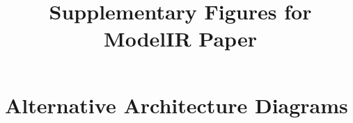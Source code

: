 \documentclass[conference]{IEEEtran}
\begin{document}
\title{Supplementary Figures for ModelIR Paper}
\maketitle

\section{Alternative Architecture Diagrams}

\end{document}
